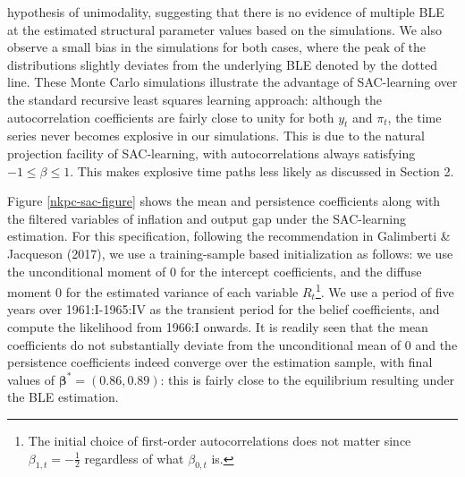 hypothesis of unimodality, suggesting that there is no evidence of multiple {BLE} at the estimated structural parameter values based on the simulations. We also observe a small bias in the simulations for both cases, where the peak of the distributions slightly deviates from the underlying BLE denoted by the dotted line. These Monte Carlo  simulations  illustrate the advantage of SAC-learning over the standard recursive least squares learning approach: although the autocorrelation coefficients are fairly close to unity for both $y_t$ and $\pi_t$, the time series never becomes explosive in our simulations. This is due to the natural projection facility of SAC-learning, with autocorrelations always satisfying $-1 \leq \beta \leq 1$. This makes explosive time paths less likely as discussed in Section 2. 


Figure \ref{nkpc-sac-figure} shows the mean and persistence coefficients along with the filtered variables of inflation and output gap under the SAC-learning estimation. For this specification, following the recommendation in Galimberti \& Jacqueson (2017), we use a training-sample based initialization as follows: we use the unconditional moment of 0 for the intercept coefficients, and the diffuse moment 0 for the estimated variance of each variable $R_t$\footnote{The initial choice of first-order autocorrelations does not matter since $\beta_{1,t}=-\frac{1}{2}$ regardless of what $\beta_{0,t}$ is.}. We use a period of five years over 1961:I-1965:IV as the transient period for the belief coefficients, and compute the likelihood from 1966:I onwards. It is readily seen that the mean coefficients do not substantially deviate from the unconditional mean of 0 and the persistence coefficients indeed converge over the estimation sample, with final values of $\boldsymbol \beta^{*}=(0.86, 0.89)$: this is fairly close to the equilibrium resulting under the BLE estimation. 



